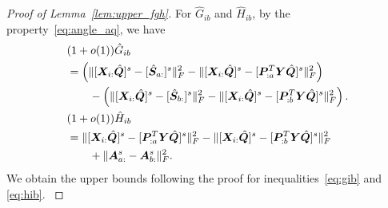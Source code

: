 \documentclass[journal]{IEEEtran}
\theoremstyle{definition}
\theoremstyle{definition}
\newcommand{\of}[1]{\left(#1\right)}
\begin{document}
\begin{proof}[Proof of Lemma~\ref{lem:upper_fgh}]
{For $\hat G_{ib}$ and $\hat H_{ib}$, by the property~\eqref{eq:angle_aq}, we have 
    \begin{align}
        &(1+o(1))\hat G_{ib}\\
        & = \of{ \onormSize{}{[\mX_{i:}\hat \mQ]^s - [\hat \mS_{a:}]^s}_F^2 - \onormSize{}{ [\mX_{i:} \hat \mQ]^s - [\mP_{:a}^T \mY \hat \mQ ]^s }_F^2  } \\
        & \quad \quad- \of{ \onormSize{}{[\mX_{i:} \hat \mQ]^s - [\hat \mS_{b:}]^s}_F^2 - \onormSize{}{ [\mX_{i:} \hat \mQ]^s - [\mP_{:b}^T \mY \hat \mQ ]^s }_F^2   }. \\
        &(1+o(1))\hat H_{ib}  \\
        & = \onormSize{}{ [\mX_{i:} \hat \mQ]^s - [\mP_{:a}^T \mY \hat \mQ ]^s }_F^2 - \onormSize{}{ [\mX_{i:} \hat \mQ]^s - [\mP_{:b}^T \mY \hat \mQ]^s }_F^2 \\
        & \quad \quad + \onormSize{}{ \mA^s_{a:} -  \mA^s_{b:}  }_F^2.
    \end{align}
    We obtain the upper bounds following the proof for inequalities~\eqref{eq:gib} and \eqref{eq:hib}.
}


\end{proof}
\end{document}
